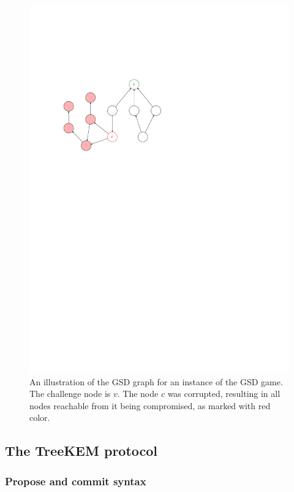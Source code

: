 \begin{figure}
	\begin{center}
		\includegraphics{figures/gsd-example}
	\end{center}
	\caption{An illustration of the GSD graph for an instance of the GSD game. The challenge node is $v$. The node $c$ was corrupted, resulting in all nodes reachable from it being compromised, as marked with red color.} \label{fig:gsd-example}
\end{figure}

\subsection{The TreeKEM protocol} \label{sec:treekem-overview}

\subsubsection{Propose and commit syntax}

